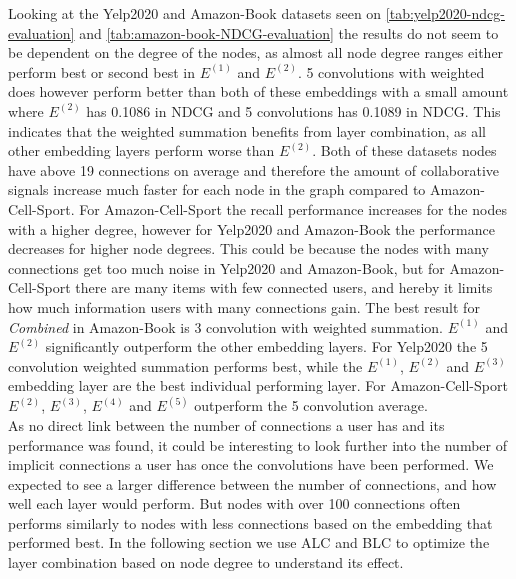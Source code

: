 Looking at the Yelp2020 and Amazon-Book datasets seen on \autoref{tab:yelp2020-ndcg-evaluation} and \autoref{tab:amazon-book-NDCG-evaluation} the results do not seem to be dependent on the degree of the nodes, as almost all node degree ranges either perform best or second best in $E^{(1)}$ and $E^{(2)}$.
5 convolutions with weighted does however perform better than both of these embeddings with a small amount where $E^{(2)}$ has 0.1086 in NDCG and 5 convolutions has 0.1089 in NDCG.
This indicates that the weighted summation benefits from layer combination, as all other embedding layers perform worse than $E^{(2)}$.
Both of these datasets nodes have above 19 connections on average and therefore the amount of collaborative signals increase much faster for each node in the graph compared to Amazon-Cell-Sport.
For Amazon-Cell-Sport the recall performance increases for the nodes with a higher degree, however for Yelp2020 and Amazon-Book the performance decreases for higher node degrees.
This could be because the nodes with many connections get too much noise in Yelp2020 and Amazon-Book, but for Amazon-Cell-Sport there are many items with few connected users, and hereby it limits how much information users with many connections gain.
The best result for \textit{Combined} in Amazon-Book is 3 convolution with weighted summation.
$E^{(1)}$ and $E^{(2)}$ significantly outperform the other embedding layers.
For Yelp2020 the 5 convolution weighted summation performs best, while the $E^{(1)}$, $E^{(2)}$ and $E^{(3)}$ embedding layer are the best individual performing layer.
For Amazon-Cell-Sport $E^{(2)}$, $E^{(3)}$, $E^{(4)}$ and $E^{(5)}$ outperform the 5 convolution average.
\\
As no direct link between the number of connections a user has and its performance was found, it could be interesting to look further into the number of implicit connections a user has once the convolutions have been performed.
We expected to see a larger difference between the number of connections, and how well each layer would perform.
But nodes with over 100 connections often performs similarly to nodes with less connections based on the embedding that performed best.
In the following section we use ALC and BLC to optimize the layer combination based on node degree to understand its effect.


